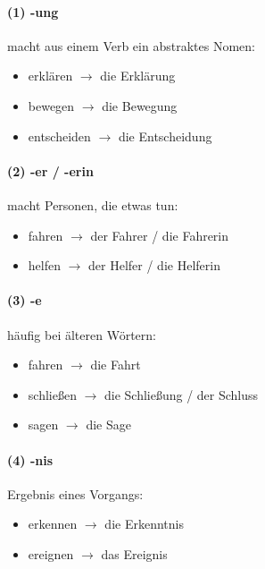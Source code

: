         \paragraph{(1) -ung}
            macht aus einem Verb ein abstraktes Nomen:
        \begin{itemize}
            \item erklären $\rightarrow$ die Erklärung
            \item bewegen $\rightarrow$ die Bewegung
            \item entscheiden $\rightarrow$ die Entscheidung
            \end{itemize}
        
        \paragraph{(2) -er / -erin}
            macht Personen, die etwas tun:
        \begin{itemize}
            \item fahren $\rightarrow$ der Fahrer / die Fahrerin
            \item helfen $\rightarrow$ der Helfer / die Helferin
            \end{itemize}
        
        \paragraph{(3) -e}
            häufig bei älteren Wörtern:
        \begin{itemize}
            \item fahren $\rightarrow$ die Fahrt
            \item schließen $\rightarrow$ die Schließung / der Schluss
            \item sagen $\rightarrow$ die Sage
            \end{itemize}
        
        \paragraph{(4) -nis}
            Ergebnis eines Vorgangs:
        \begin{itemize}
            \item erkennen $\rightarrow$ die Erkenntnis
            \item ereignen $\rightarrow$ das Ereignis
            \end{itemize}
        
